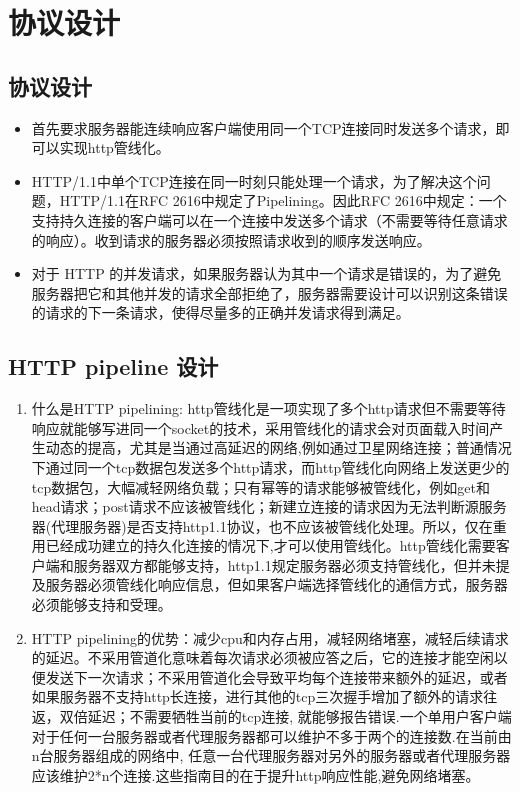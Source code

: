 \chapter{协议设计}

\section{协议设计}

\begin{itemize}
    \item 首先要求服务器能连续响应客户端使用同一个TCP连接同时发送多个请求，即可以实现http管线化。
    \item HTTP/1.1中单个TCP连接在同一时刻只能处理一个请求，为了解决这个问题，HTTP/1.1在RFC 2616中规定了Pipelining。因此RFC 2616中规定：一个支持持久连接的客户端可以在一个连接中发送多个请求（不需要等待任意请求的响应）。收到请求的服务器必须按照请求收到的顺序发送响应。
    \item 对于 HTTP 的并发请求，如果服务器认为其中一个请求是错误的，为了避免服务器把它和其他并发的请求全部拒绝了，服务器需要设计可以识别这条错误的请求的下一条请求，使得尽量多的正确并发请求得到满足。
\end{itemize}

\section{HTTP pipeline 设计}

\begin{enumerate}
    \item 什么是HTTP pipelining: http管线化是一项实现了多个http请求但不需要等待响应就能够写进同一个socket的技术，采用管线化的请求会对页面载入时间产生动态的提高，尤其是当通过高延迟的网络,例如通过卫星网络连接；普通情况下通过同一个tcp数据包发送多个http请求，而http管线化向网络上发送更少的tcp数据包，大幅减轻网络负载；只有幂等的请求能够被管线化，例如get和head请求；post请求不应该被管线化；新建立连接的请求因为无法判断源服务器(代理服务器)是否支持http1.1协议，也不应该被管线化处理。所以，仅在重用已经成功建立的持久化连接的情况下,才可以使用管线化。http管线化需要客户端和服务器双方都能够支持，http1.1规定服务器必须支持管线化，但并未提及服务器必须管线化响应信息，但如果客户端选择管线化的通信方式，服务器必须能够支持和受理。
    \item HTTP pipelining的优势：减少cpu和内存占用，减轻网络堵塞，减轻后续请求的延迟。不采用管道化意味着每次请求必须被应答之后，它的连接才能空闲以便发送下一次请求；不采用管道化会导致平均每个连接带来额外的延迟，或者如果服务器不支持http长连接，进行其他的tcp三次握手增加了额外的请求往返，双倍延迟；不需要牺牲当前的tcp连接, 就能够报告错误.一个单用户客户端对于任何一台服务器或者代理服务器都可以维护不多于两个的连接数.在当前由n台服务器组成的网络中, 任意一台代理服务器对另外的服务器或者代理服务器应该维护2*n个连接.这些指南目的在于提升http响应性能,避免网络堵塞。
\end{enumerate}
